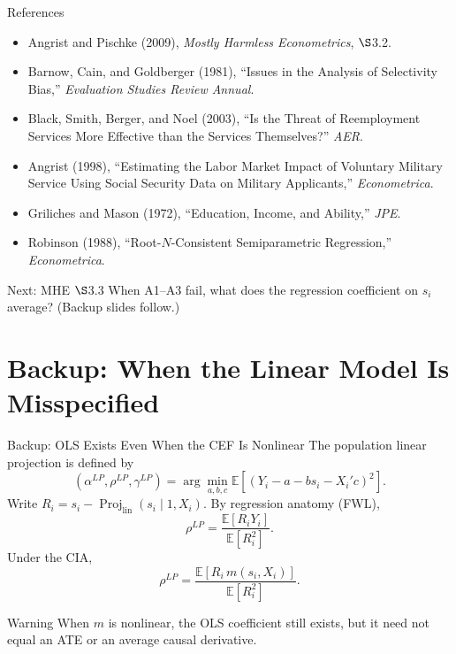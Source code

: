 \documentclass[aspectratio=169,11pt]{beamer}
\newcommand{\E}{\mathbb{E}}
\begin{document}
\begin{frame}{References}
\small
\begin{itemize}
\setlength{\itemsep}{0.45em}
\item Angrist and Pischke (2009), \emph{Mostly Harmless Econometrics}, \ensuremath{\S}3.2.
\item Barnow, Cain, and Goldberger (1981), ``Issues in the Analysis of Selectivity Bias,'' \emph{Evaluation Studies Review Annual}.
\item Black, Smith, Berger, and Noel (2003), ``Is the Threat of Reemployment Services More Effective than the Services Themselves?'' \emph{AER}.
\item Angrist (1998), ``Estimating the Labor Market Impact of Voluntary Military Service Using Social Security Data on Military Applicants,'' \emph{Econometrica}.
\item Griliches and Mason (1972), ``Education, Income, and Ability,'' \emph{JPE}.
\item Robinson (1988), ``Root-$N$-Consistent Semiparametric Regression,'' \emph{Econometrica}.
\end{itemize}
\medskip
\begin{block}{Next: MHE \ensuremath{\S}3.3}
When A1--A3 fail, what does the regression coefficient on $s_i$ average? (Backup slides follow.)
\end{block}
\end{frame}

\appendix
\section*{Backup: When the Linear Model Is Misspecified}
\begin{frame}{Backup: OLS Exists Even When the CEF Is Nonlinear}
\small
The population linear projection is defined by
\[
(\alpha^{LP},\rho^{LP},\gamma^{LP})
=\arg\min_{a,b,c}\E[(Y_i-a-bs_i-X_i'c)^2].
\]
Write $R_i=s_i-\operatorname{Proj}_{\mathrm{lin}}(s_i\mid1,X_i)$. By regression anatomy (FWL),
\[
\boxed{\rho^{LP}=\frac{\E[R_iY_i]}{\E[R_i^2]}.}
\]
Under the CIA,
\[
\rho^{LP}=\frac{\E[R_i\,m(s_i,X_i)]}{\E[R_i^2]}.
\]
\begin{block}{Warning}
When $m$ is nonlinear, the OLS coefficient still exists, but it \alert{need not equal an ATE or an average causal derivative}.
\end{block}
\end{frame}
\end{document}
